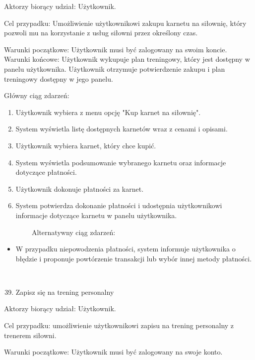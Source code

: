 \documentclass[
]{article}
\providecommand{\tightlist}{%
  \setlength{\itemsep}{0pt}\setlength{\parskip}{0pt}}
\begin{document}
{Aktorzy biorący udział: Użytkownik.}

{Cel przypadku: Umożliwienie użytkownikowi zakupu karnetu na siłownię,
który pozwoli mu na korzystanie z usług siłowni przez określony czas.}

{Warunki początkowe: Użytkownik musi być zalogowany na swoim koncie.\\
Warunki końcowe: Użytkownik wykupuje plan treningowy, który jest
dostępny w panelu użytkownika. Użytkownik otrzymuje potwierdzenie zakupu
i plan treningowy dostępny w jego panelu.}

{Główny ciąg zdarzeń:}

\begin{enumerate}
\tightlist
\item
  {Użytkownik wybiera z menu opcję "Kup karnet na siłownię".}
\item
  {System wyświetla listę dostępnych karnetów wraz z cenami i opisami.}
\item
  {Użytkownik wybiera karnet, który chce kupić.}
\item
  {System wyświetla podsumowanie wybranego karnetu oraz informacje
  dotyczące płatności.}
\item
  {Użytkownik dokonuje płatności za karnet.}
\item
  {System potwierdza dokonanie płatności i udostępnia użytkownikowi
  informacje dotyczące karnetu w panelu użytkownika.}
\end{enumerate}

{~~~~~~~~Alternatywny ciąg zdarzeń:}

\begin{itemize}
\tightlist
\item
  {W przypadku niepowodzenia płatności, system informuje użytkownika o
  błędzie i proponuje powtórzenie transakcji lub wybór innej metody
  płatności.\\
  \strut \\
  }
\end{itemize}

\begin{enumerate}
\setcounter{enumi}{38}
\tightlist
\item
  {Zapisz się na trening personalny}
\end{enumerate}

{Aktorzy biorący udział: Użytkownik.}

{Cel przypadku: umożliwienie użytkownikowi zapisu na trening personalny
z trenerem siłowni.}

{Warunki początkowe: Użytkownik musi być zalogowany na swoje konto.}
\end{document}
